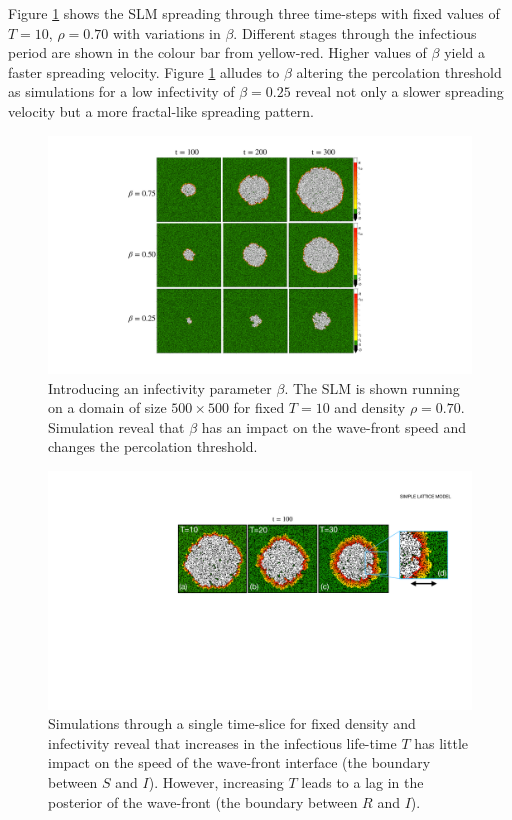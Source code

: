 Figure \ref{fig:slm} shows the SLM spreading through three time-steps with fixed values of $T=10$, $\rho=0.70$ with variations in $\beta$. %
Different stages through the infectious period are shown in the colour bar from yellow-red. %
Higher values of $\beta$ yield a faster spreading velocity. %
Figure \ref{fig:slm} alludes to $\beta$ altering the percolation threshold as simulations for a low infectivity of $\beta=0.25$ reveal not only a slower spreading velocity but a more fractal-like spreading pattern. %

\begin{figure}
    \centering
    \includegraphics[scale=0.4]{chapter3/figures/figure5.pdf}
    \caption{Introducing an infectivity parameter $\beta$. The SLM is shown running on a domain of size $500\times500$ for fixed $T=10$ and density $\rho=0.70$. Simulation reveal that $\beta$ has an impact on the wave-front speed and changes the percolation threshold.}
    \label{fig:slm}
\end{figure}

\begin{figure}
    \centering
    \includegraphics[scale=0.35]{chapter3/figures/figure5_.pdf}
    \caption{Simulations through a single time-slice for fixed density and infectivity reveal that increases in the infectious life-time $T$ has little impact on the speed of the wave-front interface (the boundary between $S$ and $I$). However, increasing $T$ leads to a lag in the posterior of the wave-front (the boundary between $R$ and $I$).}
    \label{fig:slm-wave-front}
\end{figure}

